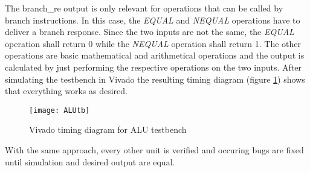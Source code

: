 The branch\_re output is only relevant for operations that can be called by branch instructions. In this case, the \textit{EQUAL} and \textit{NEQUAL} operations have to deliver a branch response. Since the two inputs are not the same, the \textit{EQUAL} operation shall return 0 while the \textit{NEQUAL} operation shall return 1. The other operations are basic mathematical and arithmetical operations and the output is calculated by just performing the respective operations on the two inputs. After simulating the testbench in Vivado the resulting timing diagram (figure \ref{fig:alutb}) shows that everything works as desired. 
\begin{figure}[H]
	\centering
	\texttt{[image: ALUtb]}
	\caption{Vivado timing diagram for ALU testbench}
	\label{fig:alutb}
\end{figure}
With the same approach, every other unit is verified and occuring bugs are fixed until simulation and desired output are equal.
